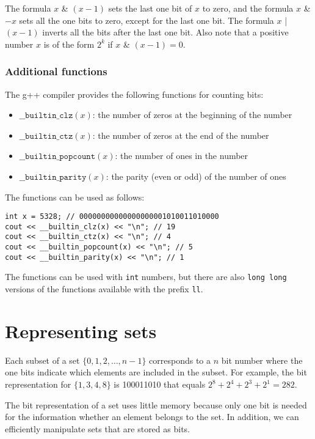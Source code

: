 The formula $x$ \& $(x-1)$ sets the last
one bit of $x$ to zero,
and the formula $x$ \& $-x$ sets all the
one bits to zero, except for the last one bit.
The formula $x$ | $(x-1)$
inverts all the bits after the last one bit.
Also note that a positive number $x$ is
of the form $2^k$ if $x$ \& $(x-1) = 0$.

\subsubsection*{Additional functions}

The g++ compiler provides the following
functions for counting bits:

\begin{itemize}
\item
$\texttt{\_\_builtin\_clz}(x)$:
the number of zeros at the beginning of the number
\item
$\texttt{\_\_builtin\_ctz}(x)$:
the number of zeros at the end of the number
\item
$\texttt{\_\_builtin\_popcount}(x)$:
the number of ones in the number
\item
$\texttt{\_\_builtin\_parity}(x)$:
the parity (even or odd) of the number of ones
\end{itemize}
\begin{samepage}

The functions can be used as follows:
\begin{lstlisting}
int x = 5328; // 00000000000000000001010011010000
cout << __builtin_clz(x) << "\n"; // 19
cout << __builtin_ctz(x) << "\n"; // 4
cout << __builtin_popcount(x) << "\n"; // 5
cout << __builtin_parity(x) << "\n"; // 1
\end{lstlisting}
\end{samepage}

The functions can be used with \texttt{int} numbers,
but there are also \texttt{long long} versions
of the functions
available with the prefix \texttt{ll}.

\section{Representing sets}

Each subset of a set $\{0,1,2,\ldots,n-1\}$
corresponds to a $n$ bit number
where the one bits indicate which elements
are included in the subset.
For example, the bit representation for $\{1,3,4,8\}$
is 100011010 that equals $2^8+2^4+2^3+2^1=282$.

The bit representation of a set uses little memory
because only one bit is needed for the information
whether an element belongs to the set.
In addition, we can efficiently manipulate sets
that are stored as bits.


